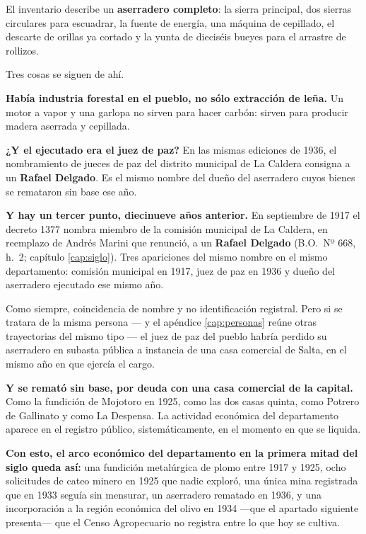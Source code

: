 El inventario describe un \textbf{aserradero completo}: la sierra principal, dos sierras
circulares para escuadrar, la fuente de energía, una máquina de cepillado, el descarte de
orillas ya cortado y la yunta de dieciséis bueyes para el arrastre de rollizos.

Tres cosas se siguen de ahí.

\textbf{Había industria forestal en el pueblo, no sólo extracción de leña.} Un motor a vapor
y una garlopa no sirven para hacer carbón: sirven para producir madera aserrada y cepillada.

\textbf{¿Y el ejecutado era el juez de paz?} En las mismas ediciones de 1936, el nombramiento
de jueces de paz del distrito municipal de La Caldera consigna a un \textbf{Rafael Delgado}.
Es el mismo nombre del dueño del aserradero cuyos bienes se remataron sin base ese año.

\textbf{Y hay un tercer punto, diecinueve años anterior.} En septiembre de 1917 el decreto 1377 nombra miembro de la comisión municipal de La Caldera, en reemplazo de Andrés Marini que renunció, a un \textbf{Rafael Delgado} (B.O.\ Nº 668, h.\ 2; capítulo \ref{cap:siglo}). Tres apariciones del mismo nombre en el mismo departamento: comisión municipal en 1917, juez de paz en 1936 y dueño del aserradero ejecutado ese mismo año.

Como siempre, coincidencia de nombre y no identificación registral. Pero si se tratara de la
misma persona --- y el apéndice \ref{cap:personas} reúne otras trayectorias del mismo tipo --- el juez de
paz del pueblo habría perdido su aserradero en subasta pública a instancia de una casa
comercial de Salta, en el mismo año en que ejercía el cargo.

\textbf{Y se remató sin base, por deuda con una casa comercial de la capital.} Como la
fundición de Mojotoro en 1925, como las dos casas quinta, como Potrero de Gallinato y como La
Despensa. La actividad económica del departamento aparece en el registro público,
sistemáticamente, en el momento en que se liquida.

\textbf{Con esto, el arco económico del departamento en la primera mitad del siglo queda así:}
una fundición metalúrgica de plomo entre 1917 y 1925, ocho solicitudes de cateo minero en
1925 que nadie exploró, una única mina registrada que en 1933 seguía sin mensurar, un
aserradero rematado en 1936, y una incorporación a la región económica del olivo en 1934 ---que el apartado siguiente presenta--- que
el Censo Agropecuario no registra entre lo que hoy se cultiva.

